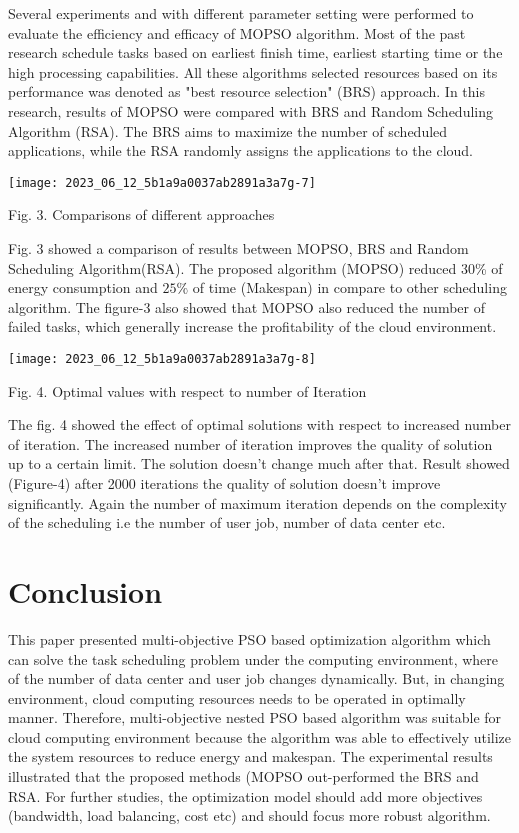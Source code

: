 \documentclass[10pt]{article}
\begin{document}
Several experiments and with different parameter setting were performed to evaluate the efficiency and efficacy of MOPSO algorithm. Most of the past research schedule tasks based on earliest finish time, earliest starting time or the high processing capabilities. All these algorithms selected resources based on its performance was denoted as "best resource selection" (BRS) approach. In this research, results of MOPSO were compared with BRS and Random Scheduling Algorithm (RSA). The BRS aims to maximize the number of scheduled applications, while the RSA randomly assigns the applications to the cloud.

\begin{center}
\texttt{[image: 2023\_06\_12\_5b1a9a0037ab2891a3a7g-7]}
\end{center}

Fig. 3. Comparisons of different approaches

Fig. 3 showed a comparison of results between MOPSO, BRS and Random Scheduling Algorithm(RSA). The proposed algorithm (MOPSO) reduced 30\% of energy consumption and $25 \%$ of time (Makespan) in compare to other scheduling algorithm. The figure-3 also showed that MOPSO also reduced the number of failed tasks, which generally increase the profitability of the cloud environment.

\begin{center}
\texttt{[image: 2023\_06\_12\_5b1a9a0037ab2891a3a7g-8]}
\end{center}

Fig. 4. Optimal values with respect to number of Iteration

The fig. 4 showed the effect of optimal solutions with respect to increased number of iteration. The increased number of iteration improves the quality of solution up to a certain limit. The solution doesn't change much after that. Result showed (Figure-4) after 2000 iterations the quality of solution doesn't improve significantly. Again the number of maximum iteration depends on the complexity of the scheduling i.e the number of user job, number of data center etc.

\section{Conclusion}
This paper presented multi-objective PSO based optimization algorithm which can solve the task scheduling problem under the computing environment, where of the number of data center and user job changes dynamically. But, in changing environment, cloud computing resources needs to be operated in optimally manner. Therefore, multi-objective nested PSO based algorithm was suitable for cloud computing environment because the algorithm was able to effectively utilize the system resources to reduce energy and makespan. The experimental results illustrated that the proposed methods (MOPSO out-performed the BRS and RSA. For further studies, the optimization model should add more objectives (bandwidth, load balancing, cost etc) and should focus more robust algorithm.
\end{document}
